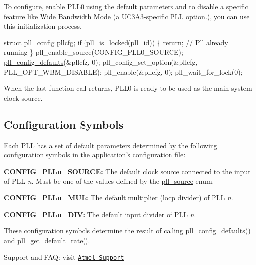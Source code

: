 To configure, enable P\-L\-L0 using the default parameters and to disable a specific feature like Wide Bandwidth Mode (a U\-C3\-A3-\/specific P\-L\-L option.), you can use this initialization process. 
\begin{DoxyCode}
        \textcolor{keyword}{struct }\hyperlink{structpll__config}{pll\_config} pllcfg;
        \textcolor{keywordflow}{if} (pll\_is\_locked(pll\_id)) \{
                \textcolor{keywordflow}{return}; \textcolor{comment}{// Pll already running}
        \}
        pll\_enable\_source(CONFIG\_PLL0\_SOURCE);
        \hyperlink{group__pll__group_ga2b9ba9ce6a7290303f6e8d41191fd0d8}{pll\_config\_defaults}(&pllcfg, 0);
        pll\_config\_set\_option(&pllcfg, PLL\_OPT\_WBM\_DISABLE);
        pll\_enable(&pllcfg, 0);
        pll\_wait\_for\_lock(0); 
\end{DoxyCode}


When the last function call returns, P\-L\-L0 is ready to be used as the main system clock source.\hypertarget{group__pll__group_pll_group_config}{}\subsection{Configuration Symbols}\label{group__pll__group_pll_group_config}
Each P\-L\-L has a set of default parameters determined by the following configuration symbols in the application's configuration file\-:
\begin{DoxyItemize}
\item {\bfseries C\-O\-N\-F\-I\-G\-\_\-\-P\-L\-Ln\-\_\-\-S\-O\-U\-R\-C\-E\-:} The default clock source connected to the input of P\-L\-L {\itshape n}. Must be one of the values defined by the \hyperlink{group__pll__group_gacfb06d8fc0ffbe934077438884ae697f}{pll\-\_\-source} enum.
\item {\bfseries C\-O\-N\-F\-I\-G\-\_\-\-P\-L\-Ln\-\_\-\-M\-U\-L\-:} The default multiplier (loop divider) of P\-L\-L {\itshape n}.
\item {\bfseries C\-O\-N\-F\-I\-G\-\_\-\-P\-L\-Ln\-\_\-\-D\-I\-V\-:} The default input divider of P\-L\-L {\itshape n}.
\end{DoxyItemize}

These configuration symbols determine the result of calling \hyperlink{group__pll__group_ga2b9ba9ce6a7290303f6e8d41191fd0d8}{pll\-\_\-config\-\_\-defaults()} and \hyperlink{group__pll__group_ga16c8db5e3f1a2c759a88371120579c4d}{pll\-\_\-get\-\_\-default\-\_\-rate()}.

Support and F\-A\-Q\-: visit \href{http://www.atmel.com/design-support/}{\tt Atmel Support} 

